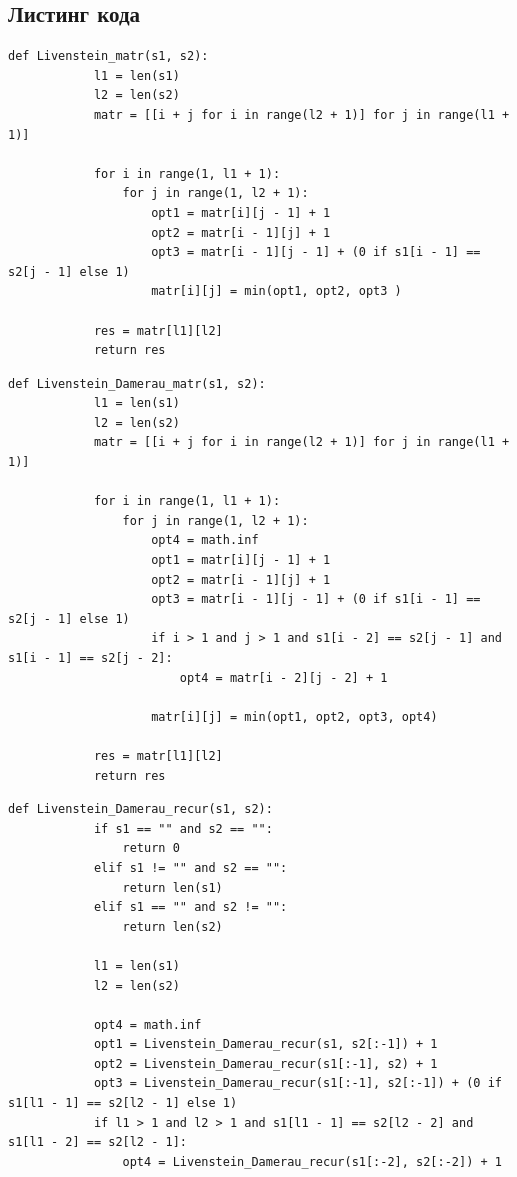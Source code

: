 \documentclass[a4paper, 14pt]{article}
\begin{document}
\begin{center}
        \subsection{Листинг кода}
        \begin{flushleft}
        \parindent=1cm
        \begin{lstlisting}[label=some-code,caption=Функция нахождения расстояния Левенштейна итеративно]
  		def Livenstein_matr(s1, s2):
    		l1 = len(s1)
    		l2 = len(s2)
		    matr = [[i + j for i in range(l2 + 1)] for j in range(l1 + 1)]
    
		    for i in range(1, l1 + 1):
        		for j in range(1, l2 + 1):
		            opt1 = matr[i][j - 1] + 1
        		    opt2 = matr[i - 1][j] + 1
            		opt3 = matr[i - 1][j - 1] + (0 if s1[i - 1] == s2[j - 1] else 1)
            		matr[i][j] = min(opt1, opt2, opt3 )
  		  	            
	    	res = matr[l1][l2]
    		return res
        \end{lstlisting}
        \newpage
        \begin{lstlisting}[label=some-code,caption=Функция нахождения расстояния Дамерау-Левенштейна итеративно]
		def Livenstein_Damerau_matr(s1, s2):
			l1 = len(s1)
			l2 = len(s2)
			matr = [[i + j for i in range(l2 + 1)] for j in range(l1 + 1)]
			
			for i in range(1, l1 + 1):
				for j in range(1, l2 + 1):
				    opt4 = math.inf
				    opt1 = matr[i][j - 1] + 1
				    opt2 = matr[i - 1][j] + 1
				    opt3 = matr[i - 1][j - 1] + (0 if s1[i - 1] == s2[j - 1] else 1)
				    if i > 1 and j > 1 and s1[i - 2] == s2[j - 1] and s1[i - 1] == s2[j - 2]:
				        opt4 = matr[i - 2][j - 2] + 1
				    
				    matr[i][j] = min(opt1, opt2, opt3, opt4)
				    
			res = matr[l1][l2]
			return res
        \end{lstlisting}
        \begin{lstlisting}[label=some-code,caption=Функция нахождения расстояния Дамерау-Левенштейна рекурсивно]
	def Livenstein_Damerau_recur(s1, s2):
			if s1 == "" and s2 == "":
				return 0
			elif s1 != "" and s2 == "":
				return len(s1)
			elif s1 == "" and s2 != "":
				return len(s2)
				
			l1 = len(s1)
			l2 = len(s2)

			opt4 = math.inf
			opt1 = Livenstein_Damerau_recur(s1, s2[:-1]) + 1
			opt2 = Livenstein_Damerau_recur(s1[:-1], s2) + 1
			opt3 = Livenstein_Damerau_recur(s1[:-1], s2[:-1]) + (0 if s1[l1 - 1] == s2[l2 - 1] else 1)    
			if l1 > 1 and l2 > 1 and s1[l1 - 1] == s2[l2 - 2] and s1[l1 - 2] == s2[l2 - 1]:
				opt4 = Livenstein_Damerau_recur(s1[:-2], s2[:-2]) + 1
				

\end{lstlisting}
\end{flushleft}
\end{center}
\end{document}
